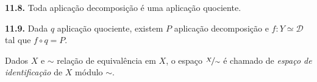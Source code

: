 \begin{proposition}
    \textbf{11.8.} Toda aplicação decomposição é uma aplicação quociente.  
\end{proposition}

\begin{proposition}
    \textbf{11.9.} Dada \(q\) aplicação quociente, existem \(P\) aplicação decomposição e \(f: Y \simeq \mathcal{D}  \) tal que \(f \circ q = P\). 
\end{proposition}

\begin{definition}
    Dados \(X\) e \(\sim \) relação de equivalência em \(X\), o espaço \(\nicefrac{X}{\sim}\) é chamado de \emph{espaço de identificação} de \(X\) módulo \(\sim\). 
\end{definition}




